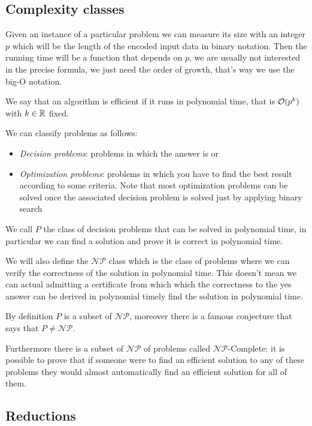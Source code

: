 \documentclass[12pt]{extarticle}
\newcommand{\NP}{{\mathcal{NP}}}
\newcommand{\NPC}{$\NP$-Complete}
\begin{document}
\subsection{Complexity classes}

Given an instance of a particular problem we can measure its size with an integer $p$ which will be the length of the encoded input data in binary notation.
Then the running time will be a function that depends on $p$, we are usually not interested in the precise formula, we just need the order of growth, that's way we use the big-O notation.

We say that an algorithm is efficient if it runs in polynomial time, that is $\mathcal{O}(p^k)$ with $k \in \mathbb{R}$ fixed.

We can classify problems as follows:
\begin{itemize}
    \item \emph{Decision problems}: problems in which the answer is  or 
    \item \emph{Optimization problems}: problems in which you have to find the best result according to some criteria.
          Note that most optimization problems can be solved once the associated decision problem is solved just by applying binary search
\end{itemize}

We call $P$ the class of decision problems that can be solved in polynomial time, in particular we can find a solution and prove it is correct in polynomial time.

We will also define the $\NP$ class which is the class of problems where we can verify the correctness of the solution in polynomial time.
This doesn't mean we can actual admitting a certificate from which which the correctness to the yes answer can be derived in polynomial timely find the solution in polynomial time.

By definition $P$ is a subset of $\NP$, moreover there is a famous conjecture that says that $P \neq \NP$.

Furthermore there is a subset of $\NP$ of problems called \NPC: it is possible to prove that if someone were to find an efficient solution to any of these problems they would almost automatically find an efficient solution for all of them.

\subsection{Reductions}
\end{document}
